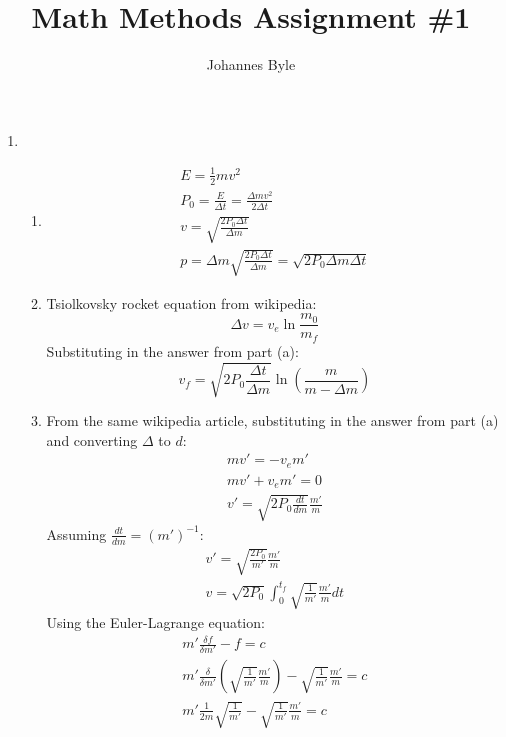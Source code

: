 \documentclass[12pt]{article}
\title{Math Methods Assignment \#1}
\author{Johannes Byle}
\begin{document}
    \maketitle
    \begin{enumerate}
        \item
        \begin{enumerate}
            \item
            \begin{gather*}
                E=\frac{1}{2}mv^2\\
                P_0=\frac{E}{\Delta t}=\frac{\Delta mv^2}{2\Delta t}\\
                v=\sqrt{\frac{2P_0\Delta t}{\Delta m}}\\
                p=\Delta m\sqrt{\frac{2P_0\Delta t}{\Delta m}}=\sqrt{2P_0\Delta m\Delta t}
            \end{gather*}
            \item
            Tsiolkovsky rocket equation from wikipedia:
            \[
                \Delta v=v_e\ln\frac{m_0}{m_f}
            \]
            Substituting in the answer from part (a):
            \[
                v_f=\sqrt{2P_0\frac{\Delta t}{\Delta m}}\ln\left(\frac{m}{m-\Delta m}\right)
            \]
            \item
            From the same wikipedia article, substituting in the answer from part (a) and converting $\Delta$ to $d$:
            \begin{gather*}
                mv'=-v_e m'\\
                mv'+v_e m'=0\\
                v'=\sqrt{2P_0 \frac{dt}{dm}}\frac{m'}{m}
            \end{gather*}
            Assuming $\frac{dt}{dm}=(m')^{-1}$:
            \begin{gather*}
                v'=\sqrt{\frac{2P_0}{m'}}\frac{m'}{m}\\
                v=\sqrt{2P_0}\int_0^{t_f}\sqrt{\frac{1}{m'}}\frac{m'}{m}dt
            \end{gather*}
            Using the Euler-Lagrange equation:
            \begin{gather*}
                m'\frac{\delta f}{\delta m'}-f=c\\
                m'\frac{\delta}{\delta m'}\left(\sqrt{\frac{1}{m'}}\frac{m'}{m}\right)-\sqrt{\frac{1}{m'}}\frac{m'}{m}=c\\
                m'\frac{1}{2 m}\sqrt{\frac{1}{m'}}-\sqrt{\frac{1}{m'}}\frac{m'}{m}=c\\

\end{gather*}
\end{enumerate}
\end{enumerate}
\end{document}
